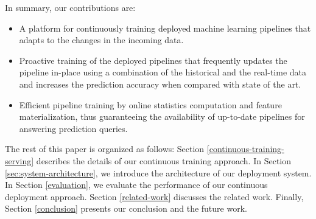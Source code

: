 In summary, our contributions are:
\begin{itemize}
\item A platform for continuously training deployed machine learning pipelines that adapts to the changes in the incoming data.
\item Proactive training of the deployed pipelines that frequently updates the pipeline in-place using a combination of the historical and the real-time data and increases the prediction accuracy when compared with state of the art.
\item Efficient pipeline training by online statistics computation and feature materialization, thus guaranteeing the availability of up-to-date pipelines for answering prediction queries.
\end{itemize}

The rest of this paper is organized as follows:
Section \ref{continuous-training-serving} describes the details of our continuous training approach.
In Section \ref{sec:system-architecture}, we introduce the architecture of our deployment system.
In Section \ref{evaluation}, we evaluate the performance of our continuous deployment approach.
Section \ref {related-work} discusses the related work.
Finally, Section \ref{conclusion} presents our conclusion and the future work.
